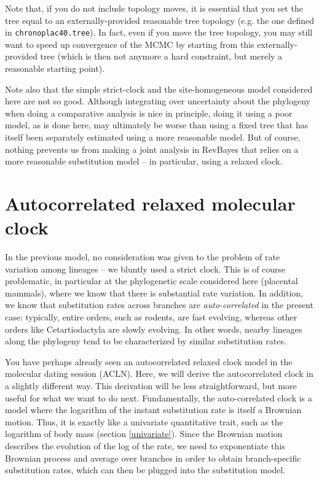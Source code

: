 \documentclass[usletter]{article}
\newcommand{\cmd}[1]{\texttt{#1}}
\begin{document}
Note that, if you do not include topology moves, it is essential that you 
set the tree equal to an externally-provided reasonable tree topology (e.g. the one defined in \cmd{chronoplac40.tree}).
In fact, even if you move the tree topology,
you may still want to speed up convergence of the MCMC by starting from this externally-provided tree
(which is then not anymore a hard constraint, but merely a reasonable starting point).

Note also that the simple strict-clock and the site-homogeneous model considered here are not so good.
Although integrating over uncertainty about the phylogeny when doing a comparative analysis is nice in principle,
doing it using a poor model, as is done here,
may ultimately be worse than using a fixed tree that has itself been separately estimated using a more reasonable model.
But of course, nothing prevents us from making a joint analysis in RevBayes
that relies on a more reasonable substitution model -- in particular, using a relaxed clock.

\section{Autocorrelated relaxed molecular clock}

In the previous model, no consideration was given to the problem of rate variation among lineages --
we bluntly used a strict clock. This is of course problematic, in particular at the phylogenetic scale considered here (placental mammals), where we know that there is substantial rate variation. In addition, we know that substitution rates across branches are \emph{auto-correlated} in the present case: typically, entire orders, such as rodents, are fast evolving, whereas other orders like Cetartiodactyla are slowly evolving. In other words, nearby lineages along the phylogeny tend to be characterized by similar substitution rates.

You have perhaps already seen an autocorrelated relaxed clock model in the molecular dating session (ACLN). Here, we will derive the autocorrelated clock in a slightly different way. This derivation will be less straightforward, but more useful for what we want to do next.
Fundamentally, the auto-correlated clock is a model where the logarithm of the instant substitution rate is itself a Brownian motion. Thus, it is exactly like a univariate quantitative trait, such as the logarithm of body mass (section \ref{univariate}). Since the Brownian motion describes the evolution of the log of the rate, we need to exponentiate this Brownian process and average over branches in order to obtain branch-specific substitution rates, which can then be plugged into the substitution model.
\end{document}
